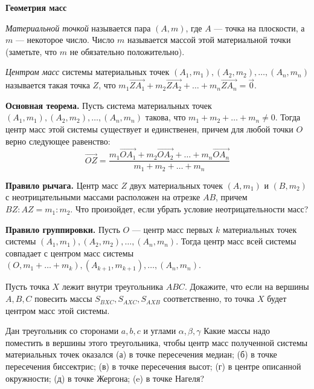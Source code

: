 \centerline{\bf \Huge Геометрия масс}

\begin{flushright}
        \scriptsize{}
\end{flushright}

\textit{Материальной точкой} называется пара $(A, m)$, где $A$ --- точка на плоскости, а $m$ --- некоторое число. Число $m$ называется массой этой материальной точки (заметьте, что $m$ не обязательно положительно).

\textit{Центром масс} системы материальных точек $(A_1, m_1), (A_2, m_2), \ldots, (A_n, m_n)$ называется такая точка $Z$, что $m_1 \overrightarrow{ZA_1} + m_2 \overrightarrow{ZA_2} + \ldots + m_n \overrightarrow{ZA_n} = \overrightarrow{0}$.

\textbf{Основная теорема.} Пусть система материальных точек $(A_1, m_1), (A_2, m_2), \ldots, (A_n, m_n)$ такова, что $m_1 + m_2 + \ldots + m_n \neq 0$. Тогда центр масс этой системы существует и единственен, причем для любой точки $O$ верно следующее равенство:
\[
\overrightarrow{OZ} = \frac{m_1 \overrightarrow{OA_1} + m_2 \overrightarrow{OA_2} + \dots + m_n \overrightarrow{OA_n}}{m_1 + m_2 + \ldots + m_n}
\]

\textbf{Правило рычага.} Центр масс $Z$ двух материальных точек $(A, m_1)$ и $(B, m_2)$ с неотрицательными массами расположен на отрезке $AB$, причем $BZ : AZ = m_1 : m_2$. Что произойдет, если убрать условие неотрицательности масс?

\textbf{Правило группировки.} Пусть $O$ --- центр масс первых $k$ материальных точек системы $(A_1, m_1), (A_2, m_2), \ldots, (A_n, m_n)$. Тогда центр масс всей системы совпадает с центром масс системы $(O, m_1 + \ldots + m_k), (A_{k+1}, m_{k+1}), \ldots, (A_n, m_n)$.

Пусть точка $X$ лежит внутри треугольника $ABC.$ Докажите, что если на вершины $A, B, C$ повесить массы $S_{BXC}, S_{AXC}, S_{AXB}$ соответственно, то точка $X$ будет центром масс этой системы.

Дан треугольник со сторонами $a, b, c$ и углами $\alpha, \beta, \gamma$ Какие массы надо поместить в вершины этого треугольника, чтобы центр масс полученной системы материальных точек оказался (а) в точке пересечения медиан; (б) в точке пересечения биссектрис; (в) в точке пересечения высот; (г) в центре описанной окружности; (д) в точке Жергона; (e) в точке Нагеля?

\newpage

\hspace{3mm}

